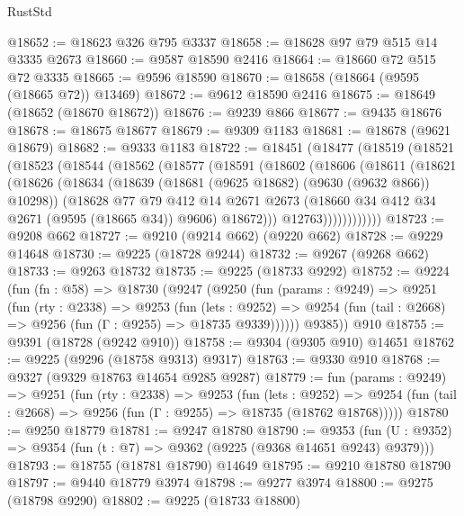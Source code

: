 \begin{lexlean}{RustStd}
\begin{coremodule}
@18652 := @18623 @326 @795 @3337
@18658 := @18628 @97 @79 @515 @14 @3335 @2673
@18660 := @9587 @18590 @2416
@18664 := @18660 @72 @515 @72 @3335
@18665 := @9596 @18590
@18670 := @18658 (@18664 (@9595 (@18665 @72)) @13469)
@18672 := @9612 @18590 @2416
@18675 := @18649 (@18652 (@18670 @18672))
@18676 := @9239 @866
@18677 := @9435 @18676
@18678 := @18675 @18677
@18679 := @9309 @1183
@18681 := @18678 (@9621 @18679)
@18682 := @9333 @1183
@18722 := @18451
    (@18477
      (@18519
        (@18521
          (@18523
            (@18544
              (@18562
                (@18577
                  (@18591
                    (@18602
                      (@18606
                        (@18611
                          (@18621
                            (@18626
                              (@18634
                                (@18639 (@18681 (@9625 @18682) (@9630 (@9632 @866)) @10298))
                                (@18628
                                  @77
                                  @79
                                  @412
                                  @14
                                  @2671
                                  @2673
                                  (@18660 @34 @412 @34 @2671 (@9595 (@18665 @34)) @9606)
                                  @18672)))
                            @12763))))))))))))
@18723 := @9208 @662
@18727 := @9210 (@9214 @662) (@9220 @662)
@18728 := @9229 @14648
@18730 := @9225 (@18728 @9244)
@18732 := @9267 (@9268 @662)
@18733 := @9263 @18732
@18735 := @9225 (@18733 @9292)
@18752 := @9224
    (fun (fn : @58) =>
    @18730
      (@9247
        (@9250
          (fun (params : @9249) =>
          @9251
            (fun (rty : @2338) =>
            @9253
              (fun (lets : @9252) =>
              @9254 (fun (tail : @2668) => @9256 (fun (Γ : @9255) => @18735 @9339))))))
        @9385))
    @910
@18755 := @9391 (@18728 (@9242 @910))
@18758 := @9304 (@9305 @910) @14651
@18762 := @9225 (@9296 (@18758 @9313) @9317)
@18763 := @9330 @910
@18768 := @9327 (@9329 @18763 @14654 @9285 @9287)
@18779 := fun (params : @9249) =>
  @9251
    (fun (rty : @2338) =>
    @9253
      (fun (lets : @9252) =>
      @9254 (fun (tail : @2668) => @9256 (fun (Γ : @9255) => @18735 (@18762 @18768)))))
@18780 := @9250 @18779
@18781 := @9247 @18780
@18790 := @9353
    (fun (U : @9352) => @9354 (fun (t : @7) => @9362 (@9225 (@9368 @14651 @9243) @9379)))
@18793 := @18755 (@18781 @18790) @14649
@18795 := @9210 @18780 @18790
@18797 := @9440 @18779 @3974
@18798 := @9277 @3974
@18800 := @9275 (@18798 @9290)
@18802 := @9225 (@18733 @18800)

\end{coremodule}
\end{lexlean}
